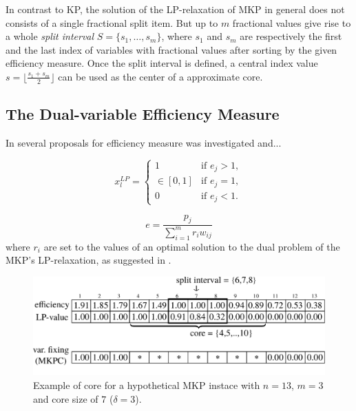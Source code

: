 In contrast to KP, the solution of the LP-relaxation of MKP in general does not
consists of a single fractional split item. But up to $m$ fractional values give
rise to a whole \emph{split interval} $S = \{ s_1, \ldots, s_m\}$, where
$s_1$ and $s_m$ are respectively the first and the last index of variables with
fractional values after sorting by the given efficiency measure.
Once the split interval is defined, a central index value $s = \lfloor \frac{s_1+s_m}{2}\rfloor$
can be used as the center of a approximate core.

\subsection{The Dual-variable Efficiency Measure}
\label{subsec:dual}
In \cite{puchinger2006core} several proposals for efficiency measure was
investigated and...

\begin{displaymath}
 x_l^{LP} =
  \begin{cases}
    1         & \mbox{if } e_j > 1, \\
    \in [0,1] & \mbox{if } e_j = 1, \\
    0         & \mbox{if } e_j < 1.
  \end{cases}
\end{displaymath}

\begin{displaymath}
  e = \frac{p_j}{\sum_{i=1}^m r_iw_{ij}}
\end{displaymath}
where $r_i$ are set to the values of an optimal solution to the dual problem of
the MKP's LP-relaxation, as suggested in \cite{Chu-Beasley-1998}.

\begin{figure}[h]
  \centering
  \includegraphics[scale=0.37]{imgs/mkp}
  \caption{Example of core for a hypothetical MKP instace with $n=13$, $m=3$ and core size of $7$ ($\delta = 3$).}
  \label{fig:mkpcore}
\end{figure}


\cite{puchinger2006core}


